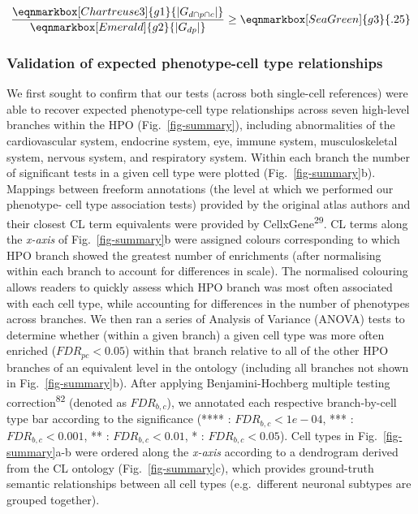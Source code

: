 \documentclass[
]{agujournal2019}
\begin{document}
\hfill\break

\begin{equation*}
  \frac{
     \eqnmarkbox[Chartreuse3]{g1}{|G_{d \cap p \cap c} |}
    }{
       \eqnmarkbox[Emerald]{g2}{|G_{dp}|}} 
  \geq \eqnmarkbox[SeaGreen]{g3}{.25} 
\end{equation*}

\hfill\break
\hfill\break

\subsubsection{Validation of expected phenotype-cell type
relationships}\label{validation-of-expected-phenotype-cell-type-relationships-1}

We first sought to confirm that our tests (across both single-cell
references) were able to recover expected phenotype-cell type
relationships across seven high-level branches within the HPO
(Fig.~\ref{fig-summary}), including abnormalities of the cardiovascular
system, endocrine system, eye, immune system, musculoskeletal system,
nervous system, and respiratory system. Within each branch the number of
significant tests in a given cell type were plotted
(Fig.~\ref{fig-summary}b). Mappings between freeform annotations (the
level at which we performed our phenotype- cell type association tests)
provided by the original atlas authors and their closest CL term
equivalents were provided by CellxGene\textsuperscript{29}. CL terms
along the \emph{x-axis} of Fig.~\ref{fig-summary}b were assigned colours
corresponding to which HPO branch showed the greatest number of
enrichments (after normalising within each branch to account for
differences in scale). The normalised colouring allows readers to
quickly assess which HPO branch was most often associated with each cell
type, while accounting for differences in the number of phenotypes
across branches. We then ran a series of Analysis of Variance (ANOVA)
tests to determine whether (within a given branch) a given cell type was
more often enriched (\(FDR_{pc}<0.05\)) within that branch relative to
all of the other HPO branches of an equivalent level in the ontology
(including all branches not shown in Fig.~\ref{fig-summary}b). After
applying Benjamini-Hochberg multiple testing
correction\textsuperscript{82} (denoted as \(FDR _{b,c}\)), we annotated
each respective branch-by-cell type bar according to the significance
(**** : \(FDR _{b,c}<1e-04\), *** : \(FDR _{b,c}<0.001\), ** :
\(FDR _{b,c}<0.01\), * : \(FDR _{b,c}<0.05\)). Cell types in
Fig.~\ref{fig-summary}a-b were ordered along the \emph{x-axis} according
to a dendrogram derived from the CL ontology (Fig.~\ref{fig-summary}c),
which provides ground-truth semantic relationships between all cell
types (e.g.~different neuronal subtypes are grouped together).
\end{document}
